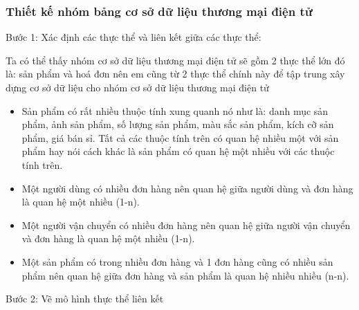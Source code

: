 \subsubsection{Thiết kế nhóm bảng cơ sở dữ liệu thương mại điện tử}
Bước 1: Xác định các thực thể và liên kết giữa các thực thể:
\par 
Ta có thể thấy nhóm cơ sở dữ liệu thương mại điện tử sẽ gồm 2 thực thể lớn đó là: sản phẩm và hoá đơn nên em cũng từ 2 thực thể chính này để tập trung xây dựng cơ sở dữ liệu cho nhóm cơ sở dữ liệu thương mại điện tử
\begin{itemize}
\item Sản phẩm có rất nhiều thuộc tính xung quanh nó như là: danh mục sản phẩm, ảnh sản phẩm, số lượng sản phẩm, màu sắc sản phẩm, kích cỡ sản phẩm, giá bán sỉ. Tất cả các thuộc tính trên có quan hệ nhiều một với sản phẩm hay nói cách khác là sản phẩm có quan hệ một nhiều với các thuộc tính trên.
\item Một người dùng có nhiều đơn hàng nên quan hệ giữa người dùng và đơn hàng là quan hệ một nhiều (1-n).
\item Một người vận chuyển có nhiều đơn hàng nên quan hệ giữa người vận chuyển và đơn hàng là quan hệ một nhiều (1-n).
\item Một sản phẩm có trong nhiều đơn hàng và 1 đơn hàng cũng có nhiều sản phẩm nên quan hệ giữa đơn hàng và sản phẩm là quan hệ nhiều nhiều (n-n). 
\end{itemize}
Bước 2: Vẽ mô hình thực thể liên kết
